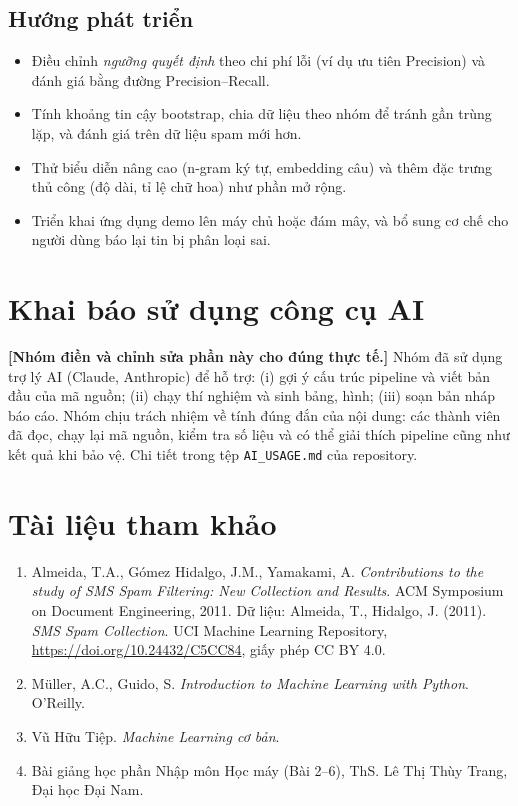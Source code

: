 \documentclass[12pt,a4paper]{article}
\begin{document}
\subsection{Hướng phát triển}
\begin{itemize}[nosep]
\item Điều chỉnh \emph{ngưỡng quyết định} theo chi phí lỗi (ví dụ ưu tiên Precision) và đánh giá bằng đường Precision--Recall.
\item Tính khoảng tin cậy bootstrap, chia dữ liệu theo nhóm để tránh gần trùng lặp, và đánh giá trên dữ liệu spam mới hơn.
\item Thử biểu diễn nâng cao (n-gram ký tự, embedding câu) và thêm đặc trưng thủ công (độ dài, tỉ lệ chữ hoa) như phần mở rộng.
\item Triển khai ứng dụng demo lên máy chủ hoặc đám mây, và bổ sung cơ chế cho người dùng báo lại tin bị phân loại sai.
\end{itemize}

\appendix
\section{Khai báo sử dụng công cụ AI}
\textbf{[Nhóm điền và chỉnh sửa phần này cho đúng thực tế.]} Nhóm đã sử dụng trợ lý AI (Claude, Anthropic) để hỗ trợ: (i) gợi ý cấu trúc pipeline và viết bản đầu của mã nguồn; (ii) chạy thí nghiệm và sinh bảng, hình; (iii) soạn bản nháp báo cáo. Nhóm chịu trách nhiệm về tính đúng đắn của nội dung: các thành viên đã đọc, chạy lại mã nguồn, kiểm tra số liệu và có thể giải thích pipeline cũng như kết quả khi bảo vệ. Chi tiết trong tệp \texttt{AI\_USAGE.md} của repository.

\section{Tài liệu tham khảo}
\begin{enumerate}[nosep]
\item Almeida, T.A., Gómez Hidalgo, J.M., Yamakami, A. \emph{Contributions to the study of SMS Spam Filtering: New Collection and Results}. ACM Symposium on Document Engineering, 2011. Dữ liệu: Almeida, T., Hidalgo, J. (2011). \emph{SMS Spam Collection}. UCI Machine Learning Repository, \url{https://doi.org/10.24432/C5CC84}, giấy phép CC BY 4.0.
\item Müller, A.C., Guido, S. \emph{Introduction to Machine Learning with Python}. O'Reilly.
\item Vũ Hữu Tiệp. \emph{Machine Learning cơ bản}.
\item Bài giảng học phần Nhập môn Học máy (Bài 2--6), ThS. Lê Thị Thùy Trang, Đại học Đại Nam.
\end{enumerate}
\end{document}
